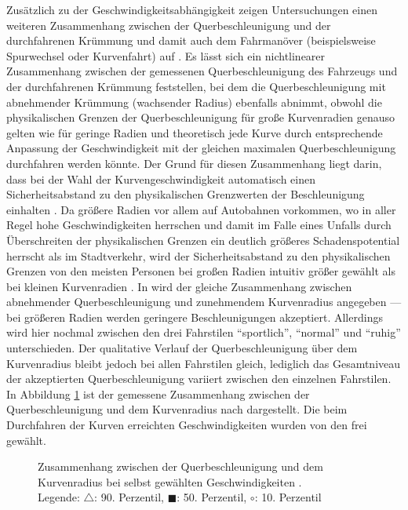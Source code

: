 Zusätzlich zu der Geschwindigkeitsabhängigkeit zeigen Untersuchungen einen weiteren Zusammenhang zwischen der Querbeschleunigung und der durchfahrenen Krümmung und damit auch dem Fahrmanöver (beispielsweise Spurwechsel oder Kurvenfahrt) auf \cite{Hugemann.2003,Xu.2015}. Es lässt sich ein nichtlinearer Zusammenhang zwischen der gemessenen Querbeschleunigung des Fahrzeugs und der durchfahrenen Krümmung feststellen, bei dem die Querbeschleunigung mit abnehmender Krümmung (wachsender Radius) ebenfalls abnimmt, obwohl die physikalischen Grenzen der Querbeschleunigung für große Kurvenradien genauso gelten wie für geringe Radien und theoretisch jede Kurve durch entsprechende Anpassung der Geschwindigkeit mit der gleichen maximalen Querbeschleunigung durchfahren werden könnte. Der Grund für diesen Zusammenhang liegt darin, dass  bei der Wahl der Kurvengeschwindigkeit automatisch einen Sicherheitsabstand zu den physikalischen Grenzwerten der Beschleunigung einhalten \cite{Hugemann.2003}. Da größere Radien vor allem auf Autobahnen vorkommen, wo in aller Regel hohe Geschwindigkeiten herrschen und damit im Falle eines Unfalls durch Überschreiten der physikalischen Grenzen ein deutlich größeres Schadenspotential herrscht als im Stadtverkehr, wird der Sicherheitsabstand zu den physikalischen Grenzen von den meisten Personen bei großen Radien intuitiv größer gewählt als bei kleinen Kurvenradien \cite{Xu.2015}. 
In \cite{Schulz.2008} wird der gleiche Zusammenhang zwischen abnehmender Querbeschleunigung und zunehmendem Kurvenradius angegeben --- bei größeren Radien werden geringere Beschleunigungen akzeptiert. Allerdings wird hier nochmal zwischen den drei Fahrstilen ``sportlich'', ``normal'' und ``ruhig'' unterschieden. Der qualitative Verlauf der Querbeschleunigung über dem Kurvenradius bleibt jedoch bei allen Fahrstilen gleich, lediglich das Gesamtniveau der akzeptierten Querbeschleunigung variiert zwischen den einzelnen Fahrstilen. In Abbildung \ref{fig:ay_R_hugemann} ist der gemessene Zusammenhang zwischen der Querbeschleunigung und dem Kurvenradius nach \cite{Hugemann.2003} dargestellt. Die beim Durchfahren der Kurven erreichten Geschwindigkeiten wurden von den  frei gewählt. 
\begin{figure}[h]
	\centering
	\fontsize{28pt}{16pt}\selectfont
	\caption{Zusammenhang zwischen der Querbeschleunigung und dem Kurvenradius bei selbst gewählten Geschwindigkeiten \cite{Hugemann.2003}. \\
		Legende: $\triangle$: 90. Perzentil, $\blacksquare$: 50. Perzentil, $\circ$: 10. Perzentil}
	\label{fig:ay_R_hugemann}
\end{figure}

